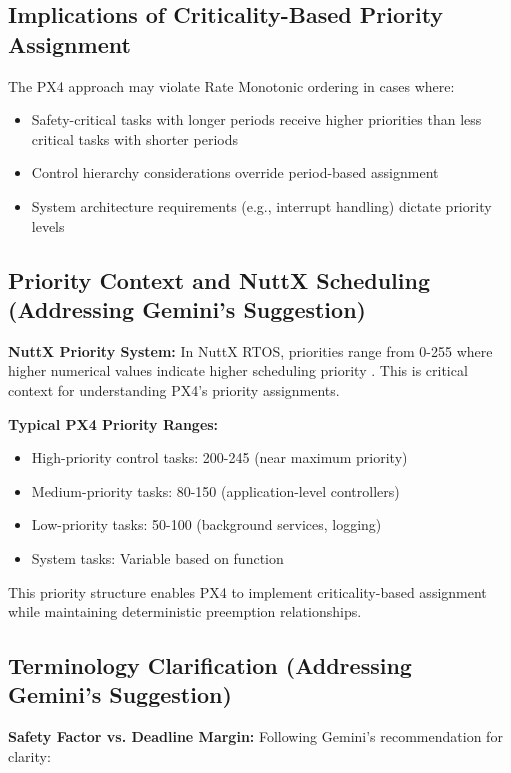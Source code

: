 \documentclass[12pt,a4paper]{article}
\begin{document}
\subsection{Implications of Criticality-Based Priority Assignment}

The PX4 approach may violate Rate Monotonic ordering in cases where:
\begin{itemize}
\item Safety-critical tasks with longer periods receive higher priorities than less critical tasks with shorter periods
\item Control hierarchy considerations override period-based assignment
\item System architecture requirements (e.g., interrupt handling) dictate priority levels
\end{itemize}

\subsection{Priority Context and NuttX Scheduling (Addressing Gemini's Suggestion)}

\textbf{NuttX Priority System:} In NuttX RTOS, priorities range from 0-255 where higher numerical values indicate higher scheduling priority \cite{nuttx}. This is critical context for understanding PX4's priority assignments.

\textbf{Typical PX4 Priority Ranges:}
\begin{itemize}
\item High-priority control tasks: 200-245 (near maximum priority)
\item Medium-priority tasks: 80-150 (application-level controllers)
\item Low-priority tasks: 50-100 (background services, logging)
\item System tasks: Variable based on function
\end{itemize}

This priority structure enables PX4 to implement criticality-based assignment while maintaining deterministic preemption relationships.

\subsection{Terminology Clarification (Addressing Gemini's Suggestion)}

\textbf{Safety Factor vs. Deadline Margin:} Following Gemini's recommendation for clarity:
\end{document}
